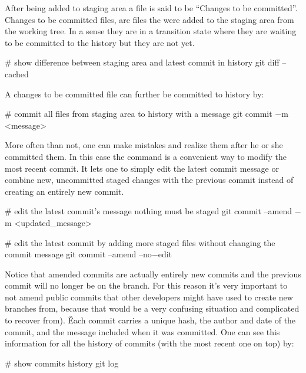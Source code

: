 After being added to staging area a file is said to be ``Changes to be committed''. Changes to be committed files,
are files the were added to the staging area from the working tree. In a sense they are in a transition state where
they are waiting to be committed to the history but they are not yet.

\begin{bash}
# show difference between staging area and latest commit in history
git diff --cached
\end{bash}

A changes to be committed file can further be committed to history by:

\begin{bash}
# commit all files from staging area to history with a message
git commit $-$m <message>
\end{bash}


More often than not, one can make mistakes and realize them after he or she committed them. In this case the
 command is a convenient way to modify the most recent commit. It lets one to simply edit
the latest commit message or combine new, uncommitted staged changes with the previous commit instead of creating an
entirely new commit.

\begin{bash}
# edit the latest commit’s message nothing must be staged
git commit --amend $-$m <updated_message>
\end{bash}

\begin{bash}
# edit the latest commit by adding more staged files without changing the commit message
git commit --amend --no$-$edit
\end{bash}

Notice that amended commits are actually entirely new commits and the previous commit will no longer be on the branch.
For this reason it’s very important to not amend public commits that other developers might have used to create new
branches from, because that would be a very confusing situation and complicated to recover from). \v

Each commit carries a unique hash, the author and date of the commit, and the message included when it was committed.
One can see this information for all the history of commits (with the most recent one on top) by:

\begin{bash}
# show commits history
git log
\end{bash}

